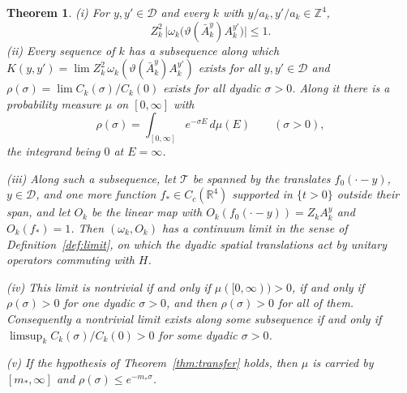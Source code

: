 \documentclass[11pt]{amsart}
\newtheorem{theorem}{Theorem}[section]
\theoremstyle{definition}
\theoremstyle{remark}
\numberwithin{equation}{section}
\newcommand{\R}{\mathbb{R}}
\newcommand{\Z}{\mathbb{Z}}
\begin{document}
\begin{theorem}\label{thm:flowlimit}
\textup{(i)} For $y,y'\in\mathcal D$ and every $k$ with $y/a_k,y'/a_k\in\Z^4$,
\[
Z_k^2\,\bigl|\omega_k\bigl(\vartheta(\bar A^y_k)A^{y'}_k\bigr)\bigr|\le1 .
\]
\textup{(ii)} Every sequence of $k$ has a subsequence along which
$K(y,y')=\lim Z_k^2\,\omega_k(\vartheta(\bar A^y_k)A^{y'}_k)$ exists for all
$y,y'\in\mathcal D$ and $\rho(\sigma)=\lim C_k(\sigma)/C_k(0)$ exists for all
dyadic $\sigma>0$. Along it there is a probability measure $\mu$ on $[0,\infty]$
with
\[
\rho(\sigma)=\int_{[0,\infty]}e^{-\sigma E}\,d\mu(E)\qquad(\sigma>0),
\]
the integrand being $0$ at $E=\infty$.

\textup{(iii)} Along such a subsequence, let $\mathcal T$ be spanned by the
translates $f_0(\cdot-y)$, $y\in\mathcal D$, and one more function $f_*\in
C_c(\R^4)$ supported in $\{t>0\}$ outside their span, and let $O_k$ be the
linear map with $O_k(f_0(\cdot-y))=Z_kA^y_k$ and $O_k(f_*)=1$. Then
$(\omega_k,O_k)$ has a continuum limit in the sense of
Definition~\ref{def:limit}, on which the dyadic spatial translations act by
unitary operators commuting with $H$.

\textup{(iv)} This limit is nontrivial if and only if $\mu([0,\infty))>0$, if and
only if $\rho(\sigma)>0$ for one dyadic $\sigma>0$, and then $\rho(\sigma)>0$
for all of them. Consequently a nontrivial limit exists along some subsequence
if and only if $\limsup_kC_k(\sigma)/C_k(0)>0$ for some dyadic $\sigma>0$.

\textup{(v)} If the hypothesis of Theorem~\ref{thm:transfer} holds, then $\mu$
is carried by $[m_*,\infty]$ and $\rho(\sigma)\le e^{-m_*\sigma}$.
\end{theorem}
\end{document}
